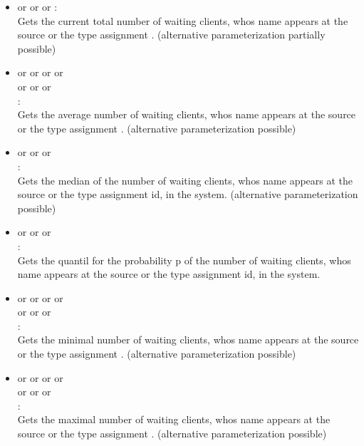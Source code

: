\begin{itemize}    

\item
{} or  or  or :\\
Gets the current total number of waiting clients, whos name appears at the source or the type assignment .
(alternative parameterization partially possible)

\item
{} or  or  or  or\\
 or  or  or\\
:\\
Gets the average number of waiting clients, whos name appears at the source or the type assignment .
(alternative parameterization possible)

\item
{} or  or  or\\
:\\
Gets the median of the number of waiting clients, whos name appears at the source or the type assignment id, in the system.
(alternative parameterization possible)

\item
{} or  or  or\\
:\\
Gets the quantil for the probability p of the number of waiting clients, whos name appears at the source or the type assignment id, in the system.

\item
{} or  or  or  or\\
 or  or  or\\
:\\
Gets the minimal number of waiting clients, whos name appears at the source or the type assignment .
(alternative parameterization possible)

\item
{} or  or  or  or\\
 or  or  or\\
:\\
Gets the maximal number of waiting clients, whos name appears at the source or the type assignment .
(alternative parameterization possible)


\end{itemize}
